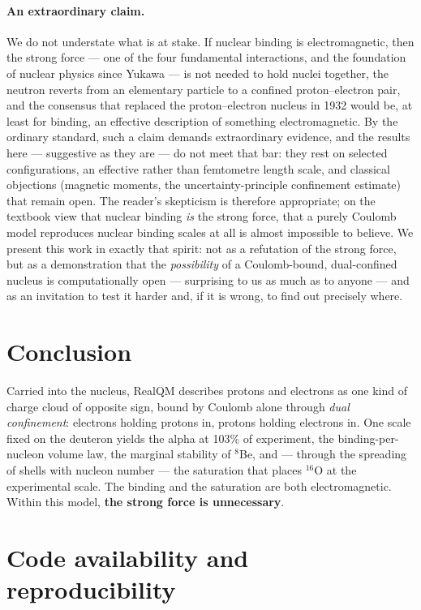 \documentclass[11pt]{article}
\begin{document}
\paragraph{An extraordinary claim.} We do not understate what is at stake. If nuclear binding is
electromagnetic, then the strong force --- one of the four fundamental interactions, and the
foundation of nuclear physics since Yukawa --- is not needed to hold nuclei together, the neutron
reverts from an elementary particle to a confined proton--electron pair, and the consensus that
replaced the proton--electron nucleus in 1932 would be, at least for binding, an effective
description of something electromagnetic. By the ordinary standard, such a claim demands
extraordinary evidence, and the results here --- suggestive as they are --- do not meet that bar:
they rest on selected configurations, an effective rather than femtometre length scale, and
classical objections (magnetic moments, the uncertainty-principle confinement estimate) that
remain open. The reader's skepticism is therefore appropriate; on the textbook view that nuclear
binding \emph{is} the strong force, that a purely Coulomb model reproduces nuclear binding scales
at all is almost impossible to believe. We present this work in exactly that spirit: not as a
refutation of the strong force, but as a demonstration that the \emph{possibility} of a
Coulomb-bound, dual-confined nucleus is computationally open --- surprising to us as much as to
anyone --- and as an invitation to test it harder and, if it is wrong, to find out precisely where.

\section{Conclusion}

Carried into the nucleus, RealQM describes protons and electrons as one kind of charge cloud of
opposite sign, bound by Coulomb alone through \emph{dual confinement}: electrons holding protons
in, protons holding electrons in. One scale fixed on the deuteron yields the alpha at 103\% of
experiment, the binding-per-nucleon volume law, the marginal stability of $^8$Be, and ---
through the spreading of shells with nucleon number --- the saturation that places $^{16}$O at
the experimental scale.
The binding and the saturation are both electromagnetic. Within this model, \textbf{the strong
force is unnecessary}.

\section*{Code availability and reproducibility}
\end{document}
